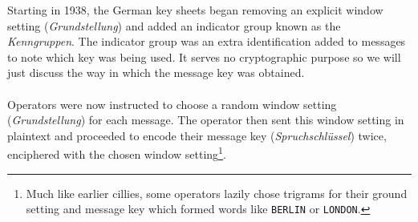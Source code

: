 Starting in 1938, the German key sheets began removing an explicit
window setting (\emph{Grundstellung}) and added an indicator group
known as the \emph{Kenngruppen}. The indicator group was an extra
identification added to messages to note which key was being used. It
serves no cryptographic purpose so we will just discuss the way in
which the message key was obtained.
\\\\Operators were now instructed to choose a random window setting
(\emph{Grundstellung}) for each message. The operator then sent this
window setting in plaintext and proceeded to encode their message key
(\emph{Spruchschlüssel}) twice, enciphered with the chosen window
setting\footnote{Much like earlier cillies, some operators lazily
  chose trigrams for their ground setting and message key which formed
words like \texttt{BERLIN} or \texttt{LONDON}.}. %
